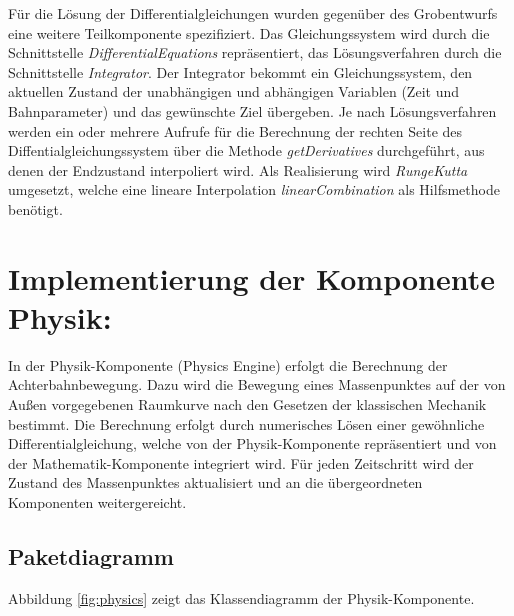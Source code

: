 Für die Lösung der Differentialgleichungen wurden gegenüber des Grobentwurfs eine
weitere Teilkomponente spezifiziert. Das Gleichungssystem wird durch die Schnittstelle
\emph{DifferentialEquations} repräsentiert, das Lösungsverfahren durch die Schnittstelle
\emph{Integrator}. Der Integrator bekommt ein Gleichungssystem, den aktuellen Zustand
der unabhängigen und abhängigen Variablen (Zeit und Bahnparameter) und das gewünschte
Ziel übergeben. Je nach Lösungsverfahren werden ein oder mehrere Aufrufe für die
Berechnung der rechten Seite des Diffentialgleichungssystem über die Methode 
\emph{getDerivatives} durchgeführt, aus denen der Endzustand interpoliert wird.
Als Realisierung wird \emph{RungeKutta} umgesetzt, welche eine lineare Interpolation
\emph{linearCombination} als Hilfsmethode benötigt.

\section{Implementierung der Komponente Physik:}

In der Physik-Komponente (Physics Engine) erfolgt die Berechnung der Achterbahnbewegung.
Dazu wird die Bewegung eines Massenpunktes auf der von Außen vorgegebenen Raumkurve
nach den Gesetzen der klassischen Mechanik bestimmt. Die Berechnung erfolgt
durch numerisches Lösen einer gewöhnliche Differentialgleichung, welche von der
Physik-Komponente repräsentiert und von der Mathematik-Komponente integriert wird.
Für jeden Zeitschritt wird der Zustand des Massenpunktes aktualisiert und an die
übergeordneten Komponenten weitergereicht.

\subsection{Paketdiagramm}
Abbildung \ref{fig:physics} zeigt das Klassendiagramm der Physik-Komponente.

